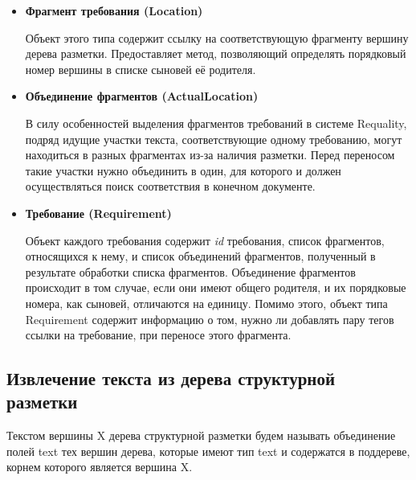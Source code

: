 \begin{itemize}
\item \textbf{Фрагмент требования (Location)}

Объект этого типа содержит ссылку на соответствующую фрагменту вершину дерева разметки. Предоставляет метод, позволяющий определять порядковый номер вершины в списке сыновей её родителя.

\item \textbf{Объединение фрагментов (ActualLocation)}

В силу особенностей выделения фрагментов требований в системе Requality, подряд идущие участки текста, соответствующие одному требованию, могут находиться в разных фрагментах из-за наличия разметки. Перед переносом такие участки нужно объединить в один, для которого и должен осуществляться поиск соответствия в конечном документе.

\item \textbf{Требование (Requirement)}

Объект каждого требования содержит \emph{id} требования, список фрагментов, относящихся к нему, и список объединений фрагментов, полученный в результате обработки списка фрагментов. Объединение фрагментов происходит в том случае, если они имеют общего родителя, и их порядковые номера, как сыновей, отличаются на единицу. Помимо этого, объект типа Requirement содержит информацию о том, нужно ли добавлять пару тегов ссылки на требование, при переносе этого фрагмента.  

\end{itemize}

\subsection{Извлечение текста из дерева структурной разметки}

Текстом вершины X дерева структурной разметки будем называть объединение полей text тех вершин дерева, которые имеют тип text и содержатся в поддереве, корнем которого является вершина X.

